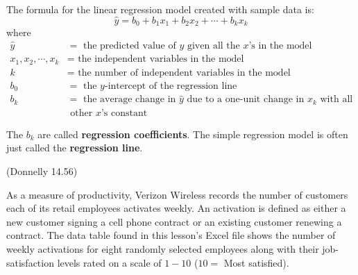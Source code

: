 \documentclass[12pt, letterpaper]{article}
\newcounter{exercise}
\theoremstyle{definition}
\begin{document}
\begin{statement}
The formula for the linear regression model created with sample data is:
$$ \hat{y} = b_0+b_1x_1+b_2x_2 + \cdots +b_kx_k $$
where
\begin{align*}
\hat{y} &= \text{ the predicted value of $y$ given all the $x$'s in the model}\\
x_1,x_2,\cdots, x_k &= \text{ the independent variables in the model}\\
k &= \text{ the number of independent variables in the model}\\
b_0 &= \text{ the $y$-intercept of the regression line}\\
b_k &= \text{ the average change in $\hat{y}$ due to a one-unit change in $x_k$ with all }\\
 &     \text{ other $x$'s constant}
\end{align*}

The $b_k$ are called \textbf{regression coefficients}.  The simple regression model is often just called the \textbf{regression line}.
\end{statement}

\newpage

\begin{exercise}  (Donnelly 14.56)

As a measure of productivity, Verizon Wireless records the number of customers each of its retail employees activates weekly.  An activation is defined as either a new customer signing a cell phone contract or an existing customer renewing a contract.  The data table found in this lesson's Excel file shows the number of weekly activations for eight randomly selected employees along with their job-satisfaction levels rated on a scale of $1-10$ ($10=$ Most satisfied).

\end{exercise}
\end{document}
